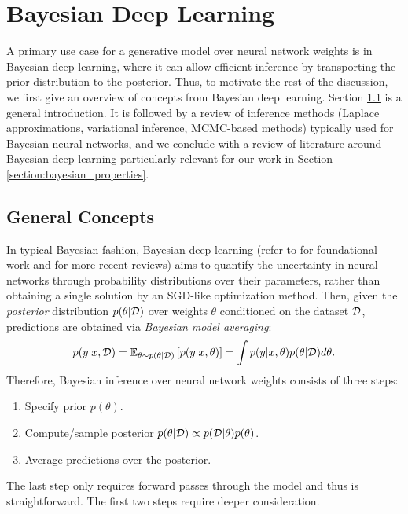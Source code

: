 
\section{Bayesian Deep Learning}\label{section:bayesian_dl}

A primary use case for a generative model over neural network weights is in Bayesian deep learning, where it can allow efficient inference by transporting the prior distribution to the posterior. Thus, to motivate the rest of the discussion, we first give an overview of concepts from Bayesian deep learning. Section \ref{section:bayesian_concepts} is a general introduction. It is followed by a review of inference methods (Laplace approximations, variational inference, MCMC-based methods) typically used for Bayesian neural networks, and we conclude with a review of literature around Bayesian deep learning particularly relevant for our work in Section \ref{section:bayesian_properties}.

\subsection{General Concepts} \label{section:bayesian_concepts}

In typical Bayesian fashion, Bayesian deep learning (refer to \citep{mackayBayesianMethodsAdaptive1992, nealBayesianLearningNeural1996} for foundational work and \citep{goanBayesianNeuralNetworks2020,arbelPrimerBayesianNeural2023} for more recent reviews) aims to quantify the uncertainty in neural networks through probability distributions over their parameters, rather than obtaining a single solution by an SGD-like optimization method. Then, given the \textit{posterior} distribution $p(\theta \vert \mathcal{D})$ over weights $\theta$ conditioned on the dataset $\mathcal{D}$, predictions are obtained via \textit{Bayesian model averaging}:
\begin{equation}
    p(y \vert x, \mathcal{D}) 
    = \mathbb{E}_{\theta \sim p(\theta \vert \mathcal{D})} \left[ p(y\vert x, \theta) \right]
    = \int p(y \vert x, \theta) p(\theta \vert \mathcal{D}) d\theta.
\end{equation}
Therefore, Bayesian inference over neural network weights consists of three steps:
\begin{enumerate}
    \item Specify prior $p(\theta)$.
    \item Compute/sample posterior $p(\theta \vert \mathcal{D}) \propto p(\mathcal{D} \vert \theta) p(\theta)$.
    \item Average predictions over the posterior. 
\end{enumerate}
The last step only requires forward passes through the model and thus is straightforward. The first two steps require deeper consideration. 

